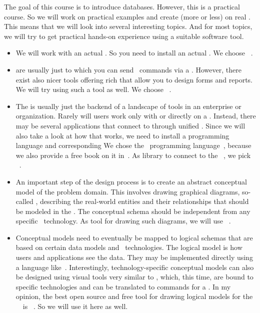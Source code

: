 %
%
%
The goal of this course is to introduce databases.
However, this is a practical course.
So we will work on practical examples and create (more or less)   on real .
This means that we will look into several interesting topics.
And for most topics, we will try to get practical hands-on experience using a suitable software tool.%
%
\begin{itemize}%
%
\item We will work with an actual .
So you need to install an actual .
We choose \postgresql~\cite{TA2024DDAMWPAM,FP2023LP,OH2017PUAR,B2024PELUYDW}.%
%
\item {} are usually just  to which you can send \sql\ commands via a  .
However, there exist also nicer tools offering rich  that allow you to design forms and reports.
We will try using such a tool as well.
We choose \libreofficeBase~\cite{FNFHWSKLSSGLFRSRPLJG2022BG7R1BOL7C,S2022L7PFEUU}.%
%
\item The  is usually just the backend of a landscape of tools in an enterprise or organization.
Rarely will users work only with or directly on a .
Instead, there may be several applications that connect to  through unified .
Since we will also take a look at how that works, we need to install a programming language and corresponding 
We chose the \python\ programming language~\cite{K2018EIPFEUU,A2002PC,H2023ABGTP3P,LH2015DSAAWP}, because we also provide a free book on it in~\cite{programmingWithPython}.
As library to connect to the \postgresql\ , we pick \psycopg~\cite{VDGE2010P}.%
%
\item An important step of the  design process is to create an abstract conceptual model of the problem domain.
This involves drawing graphical diagrams, so-called , describing the real-world entities and their relationships that should be modeled in the \db.
The conceptual schema should be independent from any specific \dbms\ technology.
As tool for drawing such diagrams, we will use \yEd~\cite{SG2015MDAWY,Y2011YGEM}.%
%
\item Conceptual models need to eventually be mapped to logical schemas that are based on certain data models and \db\ technologies.
The logical model is how users and applications see the data.
They may be implemented directly using a language like~\sql.
Interestingly, technology-specific conceptual models can also be designed using visual tools very similar to , which, this time, are bound to specific technologies and can be translated to commands for a \dbms.
In my opinion, the best open source and free tool for drawing logical models for the \postgresql\ \dbms\ is \pgmodeler~\cite{AES2006PPDM}. %
So we will use it here as well.%
%
\end{itemize}%
